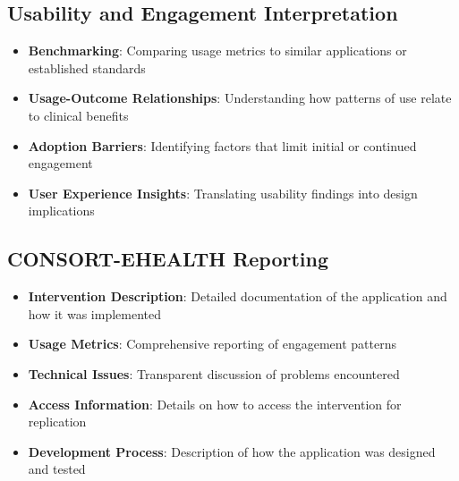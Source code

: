 \subsection{Usability and Engagement Interpretation}
\begin{itemize}
    \item \textbf{Benchmarking}: Comparing usage metrics to similar applications or established standards
    
    \item \textbf{Usage-Outcome Relationships}: Understanding how patterns of use relate to clinical benefits
    
    \item \textbf{Adoption Barriers}: Identifying factors that limit initial or continued engagement
    
    \item \textbf{User Experience Insights}: Translating usability findings into design implications
\end{itemize}

\subsection{CONSORT-EHEALTH Reporting}
\begin{itemize}
    \item \textbf{Intervention Description}: Detailed documentation of the application and how it was implemented
    
    \item \textbf{Usage Metrics}: Comprehensive reporting of engagement patterns
    
    \item \textbf{Technical Issues}: Transparent discussion of problems encountered
    
    \item \textbf{Access Information}: Details on how to access the intervention for replication
    
    \item \textbf{Development Process}: Description of how the application was designed and tested
\end{itemize}

